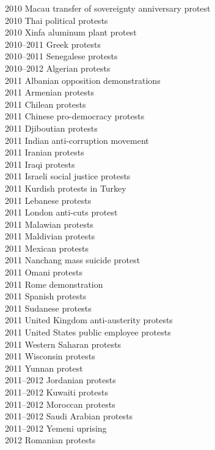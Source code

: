 \begin{multicols}{3}
2010 Macau transfer of sovereignty anniversary protest\\
2010 Thai political protests\\
2010 Xinfa aluminum plant protest\\
2010–2011 Greek protests\\
2010–2011 Senegalese protests\\
2010–2012 Algerian protests\\
2011 Albanian opposition demonstrations\\
2011 Armenian protests\\
2011 Chilean protests\\
2011 Chinese pro-democracy protests\\
2011 Djiboutian protests\\
2011 Indian anti-corruption movement\\
2011 Iranian protests\\
2011 Iraqi protests\\
2011 Israeli social justice protests\\
2011 Kurdish protests in Turkey\\
2011 Lebanese protests\\
2011 London anti-cuts protest\\
2011 Malawian protests\\
2011 Maldivian protests\\
2011 Mexican protests\\
2011 Nanchang mass suicide protest\\
2011 Omani protests\\
2011 Rome demonstration\\
2011 Spanish protests\\
2011 Sudanese protests\\
2011 United Kingdom anti-austerity protests\\
2011 United States public employee protests\\
2011 Western Saharan protests\\
2011 Wisconsin protests\\
2011 Yunnan protest\\
2011–2012 Jordanian protests\\
2011–2012 Kuwaiti protests\\
2011–2012 Moroccan protests\\
2011–2012 Saudi Arabian protests\\
2011–2012 Yemeni uprising\\
2012 Romanian protests\\

\end{multicols}
